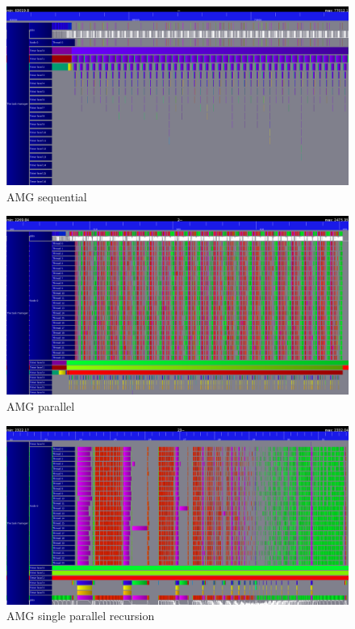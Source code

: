 \documentclass[a4paper,11pt]{scrartcl}
\begin{document}
\begin{figure}
    \includegraphics[width=1\textwidth]{seq.png}
    \caption{AMG sequential}
\end{figure}

\begin{figure}
    \includegraphics[width=1\textwidth]{iterations_trace.png}
    \caption{AMG parallel}
\end{figure}

\begin{figure}
    \includegraphics[width=1\textwidth]{one_iteration.png}
    \caption{AMG single parallel recursion}
\end{figure}
\end{document}
